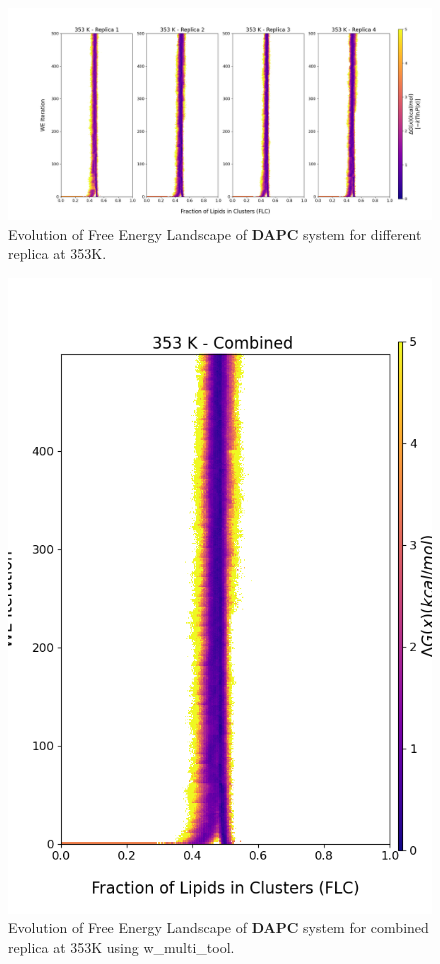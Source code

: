 \documentclass{biophys-new}
\begin{document}
\begin{figure}[hbt!]
\centering
\includegraphics[width=1.1\linewidth]{all_plots/ClusterLipids2Total/DPPC_DAPC_CHOL/353K/Evolution_DAPC_353_ClusterLipids2Total.png}
\caption{Evolution of Free Energy Landscape of \textbf{DAPC} system for different replica at 353K.}
\label{fig:view}

\end{figure}

\begin{figure}[hbt!]
\centering
\includegraphics[width=0.8\linewidth]{all_plots/ClusterLipids2Total/DPPC_DAPC_CHOL/353K/Evolution_DAPC_MULTI__353_ClusterLipids2Total.png}
\caption{Evolution of Free Energy Landscape of \textbf{DAPC} system for combined replica at 353K using w\_multi\_tool.}
\label{fig:view}

\end{figure}
\end{document}
